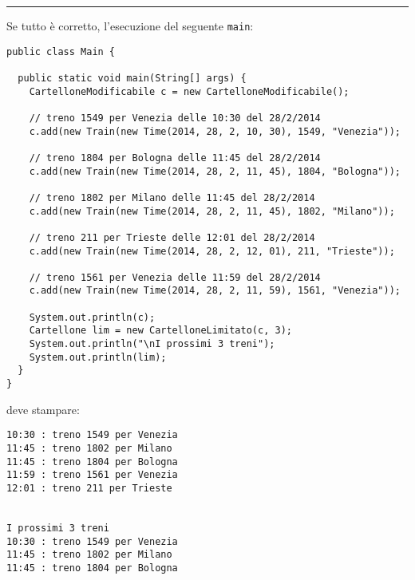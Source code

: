\documentclass{article}[10pt]
\begin{document}
\hrule

\vspace*{1ex}
Se tutto \`e corretto, l'esecuzione del seguente \texttt{main}:
%
{\small
\begin{verbatim}
public class Main {

  public static void main(String[] args) {
    CartelloneModificabile c = new CartelloneModificabile();

    // treno 1549 per Venezia delle 10:30 del 28/2/2014
    c.add(new Train(new Time(2014, 28, 2, 10, 30), 1549, "Venezia"));

    // treno 1804 per Bologna delle 11:45 del 28/2/2014
    c.add(new Train(new Time(2014, 28, 2, 11, 45), 1804, "Bologna"));

    // treno 1802 per Milano delle 11:45 del 28/2/2014
    c.add(new Train(new Time(2014, 28, 2, 11, 45), 1802, "Milano"));

    // treno 211 per Trieste delle 12:01 del 28/2/2014
    c.add(new Train(new Time(2014, 28, 2, 12, 01), 211, "Trieste"));

    // treno 1561 per Venezia delle 11:59 del 28/2/2014
    c.add(new Train(new Time(2014, 28, 2, 11, 59), 1561, "Venezia"));

    System.out.println(c);
    Cartellone lim = new CartelloneLimitato(c, 3);
    System.out.println("\nI prossimi 3 treni");
    System.out.println(lim);
  }
}
\end{verbatim}}

\noindent
deve stampare:

{\small
\begin{verbatim}
10:30 : treno 1549 per Venezia
11:45 : treno 1802 per Milano
11:45 : treno 1804 per Bologna
11:59 : treno 1561 per Venezia
12:01 : treno 211 per Trieste


I prossimi 3 treni
10:30 : treno 1549 per Venezia
11:45 : treno 1802 per Milano
11:45 : treno 1804 per Bologna
\end{verbatim}}
\end{document}
